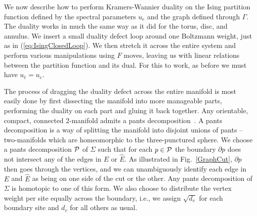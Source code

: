 \documentclass[11pt]{article}
\newcommand{\dave}[1]{{\color{red}\footnotesize{(DA) #1}}}
\numberwithin{equation}{section}		%
\begin{document}

 
We now describe how to perform Kramers-Wannier duality on the Ising partition function defined by the spectral parameters $u_{e}$ and the graph defined through $\Gamma$.
The duality works in much the same way as it did for the torus, disc, and annulus. 
We insert a small duality defect loop around one Boltzmann weight, just as in  (\ref{eq:IsingClosedLoop}). We then stretch it across the entire system and perform various manipulations using $F$ moves, leaving us with linear relations between the partition function and its dual.
For this to work, as before we must have ${u}_{\widehat{e}}=u_e$.


The process of dragging the duality defect across the entire manifold is most easily done by first dissecting the manifold into more manageable parts, performing the duality on each part and gluing it back together. 
Any orientable, compact, connected 2-manifold admits a pants decomposition~\cite{Hatcher1980}. 
A pants decomposition is a way of splitting the manifold into disjoint unions of pants -- two-manifolds which are homeomorphic to the three-punctured sphere.
We choose a pants decomposition ${\cal P}$ of $\Sigma$ 
such that for each $p \in {\cal P}$ the boundary $\partial p$ does not intersect any of the edges in $E$ or $\widehat{E}$. %
As illustrated in Fig.~\ref{GraphCut},  $\partial p$ then goes through the vertices, and we can unambiguously identify each edge in $E$ and $\widehat{E}$ as being on one side of the cut or the other. 
Any pants decomposition of $\Sigma$ is homotopic to one of this form.
We also choose to distribute the vertex weight per site equally across the boundary, i.e., we assign $\sqrt{d_v}$ for each boundary site and $d_v$ for all others as usual.
\end{document}
